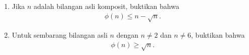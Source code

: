\documentclass[12pt]{scrartcl}
\begin{document}
\begin{enumerate}[resume]
    \item Jika $n$ adalah bilangan asli komposit, buktikan bahwa
    \begin{align*}
        \phi(n) \le n - \sqrt{n}.
    \end{align*}

    \item Untuk sembarang bilangan asli $n$ dengan $n \neq 2$ dan $n \neq 6$, buktikan bahwa
    \begin{align*}
        \phi(n) \ge \sqrt{n}.
    \end{align*}
\end{enumerate}
\end{document}
